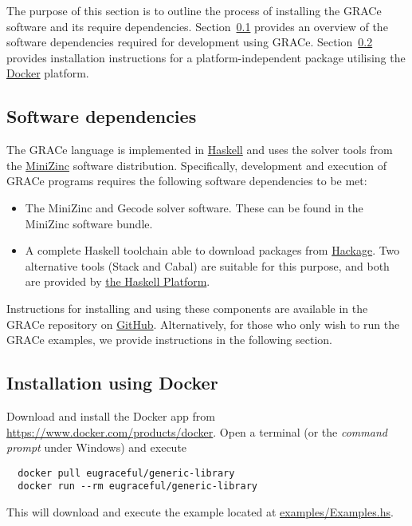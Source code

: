 
The purpose of this section is to outline the process of installing
the GRACe software and its require dependencies.
%
Section~\ref{install-overview} provides an overview of the software
dependencies required for development using GRACe.
%
Section~\ref{install-docker} provides installation instructions for a
platform-independent package utilising the
\href{https://www.docker.com/}{Docker}
platform.


\subsection{Software dependencies}
\label{install-overview}

The GRACe language is implemented in
\href{https://www.haskell.org/}{Haskell} and uses the solver tools
from the \href{http://www.minizinc.org/}{MiniZinc} software
distribution.
%
Specifically, development and execution of \mbox{GRACe} programs
requires the following software dependencies to be met:

\begin{itemize}
\item The MiniZinc and Gecode solver software.
%
  These can be found in the MiniZinc software bundle.
%
\item A complete Haskell toolchain able to download packages from
  \href{https://hackage.haskell.org/}{Hackage}.
%
  Two alternative tools (Stack and Cabal) are suitable for this
  purpose, and both are provided by
  \href{https://www.haskell.org/platform/}{the Haskell Platform}.
\end{itemize}

Instructions for installing and using these components are available in the
\mbox{GRACe} repository on \href{https://github.com/GRACeFUL-project/%
GRACe/blob/master/doc/INSTALL.md}{GitHub}.
%
Alternatively, for those who only wish to run the GRACe
examples, we provide instructions in the following section.


\subsection{Installation using Docker}
\label{install-docker}

Download and install the Docker app from \url{https://www.docker.com/products/docker}.
%
Open a terminal (or the \emph{command prompt} under Windows) and
execute
\begin{verbatim}
  docker pull eugraceful/generic-library
  docker run --rm eugraceful/generic-library
\end{verbatim}

This will download and execute the example located at
\href{https://github.com/GRACeFUL-project/GRACe/blob/master/examples/Examples.hs}{examples/Examples.hs}.
